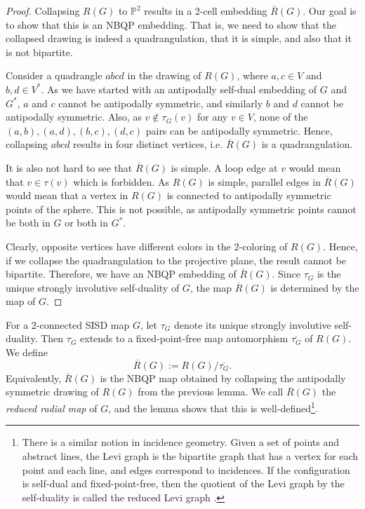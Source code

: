 \documentclass{article}
\newcommand{\Pb}[0]{\mathbb{P}}
\begin{document}
\begin{proof}
 Collapsing $R(G)$ to $\Pb^2$ results in a 2-cell embedding  $\overline R(G)$. Our goal is to show that this is an NBQP embedding. That is, we need to show that the collapsed drawing is indeed a quadrangulation, that it is simple, and also that it is not bipartite. 
 
 Consider a quadrangle $abcd$ in the drawing of $R(G)$, where $a,c\in V$ and $b,d\in V^*$. As we have started with an antipodally self-dual embedding of $G$ and $G^*$, $a$ and $c$ cannot be antipodally symmetric, and similarly $b$ and $d$ cannot be antipodally symmetric.   
  Also, as $v\notin \tau_G(v)$ for any $v\in V $, none of the $(a,b), (a,d),(b,c),(d,c)$ pairs can be antipodally symmetric. Hence, collapsing $abcd$ results in four distinct vertices, i.e. $\overline R(G)$ is a quadrangulation.  
  
  It is also not hard to see that $\overline R(G)$ is simple. A loop edge at $v$ would mean that $v\in \tau(v)$ which is forbidden. As $R(G)$ is simple, parallel edges in $\overline R(G)$ would mean that a vertex in $R(G)$ is connected to antipodally symmetric points of the sphere. This is not possible, as antipodally symmetric points cannot be both in $G$ or both in $G^*$.
 
 Clearly, opposite vertices have different colors in the 2-coloring of $R(G)$. Hence, if we collapse the quadrangulation to the projective plane, the result cannot be bipartite. Therefore, we have an NBQP embedding of $\overline R(G)$. Since $\tau_G$ is the unique strongly involutive self-duality of $G$, the map $\overline R(G)$ is determined by the map of $G$.
    
\end{proof}

For a 2-connected SISD map $G$, let $\tau_G$ denote its unique strongly involutive self-duality. Then $\tau_G$ extends to a fixed-point-free map automorphism $\overline{\tau_G}$ of $R(G)$.  We define\[\overline R(G):=R(G)/\overline{\tau_G}.\] Equivalently, $\overline R(G)$ is the NBQP map obtained by collapsing the antipodally symmetric drawing of $R(G)$ from the previous lemma. We call $\overline R(G)$ the \emph{reduced radial map} of $G$, and the lemma shows that this is well-defined\footnote{There is a similar notion in incidence geometry. Given a set of points and abstract lines, the Levi graph is the bipartite graph that has a vertex for each point and each line, and edges correspond to incidences. If the configuration is self-dual and fixed-point-free, then the quotient of the Levi graph by the self-duality is called the reduced Levi graph \cite{artzy1956}.}.
\end{document}
